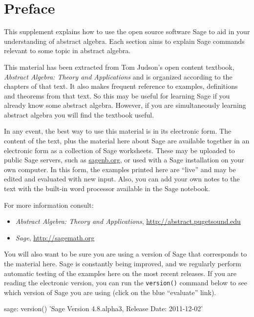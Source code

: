 \documentclass[12pt,oneside]{book}
\begin{document}
\chapter*{Preface}
This supplement explains how to use the open source software Sage to aid in your understanding of abstract algebra.  Each section aims to explain Sage commands relevant to some topic in abstract algebra.\par
%
This material has been extracted from Tom Judson's open content textbook, {\sl Abstract Algebra: Theory and Applications} and is organized according to the chapters of that text.  It also makes frequent reference to examples, definitions and theorems from that text.  So this may be useful for learning Sage if you already know some abstract algebra.  However, if you are simultaneously learning abstract algebra you will find the textbook useful.\par
%
In any event, the best way to use this material is in its electronic form.  The content of the text, plus the material here about Sage are available together in an electronic form as a collection of Sage worksheets.  These may be uploaded to public Sage servers, such as \url{sagenb.org}, or used with a Sage installation on your own computer.  In this form, the examples printed here are ``live'' and may be edited and evaluated with new input.  Also, you can add your own notes to the text with the built-in word processor available in the Sage notebook.\par
%
For more information consult:
%
\begin{itemize}
%
\item {\sl Abstract Algebra: Theory and Applications}, \url{http://abstract.pugetsound.edu}
%
\item {\sl Sage}, \url{http://sagemath.org}
%
\end{itemize}
%
You will also want to be sure you are using a version of Sage that corresponds to the material here.  Sage is constantly being improved, and we regularly perform automatic testing of the examples here on the most recent releases.  If you are reading the electronic version, you can run the \verb?version()? command below to see which version of Sage you are using (click on the blue ``evaluate'' link).
%
\begin{sageverbatim}
sage: version()
'Sage Version 4.8.alpha3, Release Date: 2011-12-02'
\end{sageverbatim}
%
\begin{sageverbatim}
\end{sageverbatim}
\end{document}
